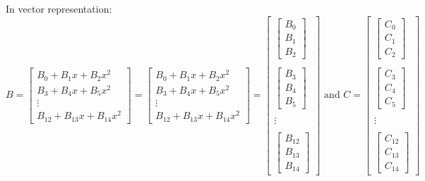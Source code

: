 \documentclass[
11pt,notheorems,hyperref={pdfauthor=whatever}
]{beamer}
\begin{document}
\begin{frame}
    In vector representation:
    \[
    B = \begin{bmatrix}
        B_{0} + B_{1} x + B_{2} x^2 \\
        B_{3} + B_{4} x + B_{5} x^2 \\
        \vdots \\
        B_{12} + B_{13} x + B_{14} x^2 
    \end{bmatrix}
    = \begin{bmatrix}
        B_{0} + B_{1} x + B_{2} x^2 \\
        B_{3} + B_{4} x + B_{5} x^2 \\
        \vdots \\
        B_{12} + B_{13} x + B_{14} x^2 
    \end{bmatrix}
    =
    \begin{bmatrix}
        \begin{bmatrix}
            B_{0} \\ B_{1} \\ B_{2} 
        \end{bmatrix} \\ \\
        \begin{bmatrix}
            B_{3} \\ B_{4} \\ B_{5}
        \end{bmatrix} \\ \\
        \vdots \\\\
        \begin{bmatrix}
            B_{12} \\ B_{13} \\ B_{14}
        \end{bmatrix}
    \end{bmatrix}
    \text{ and }
    C =
    \begin{bmatrix}
        \begin{bmatrix}
            C_{0} \\ C_{1} \\ C_{2} 
        \end{bmatrix} \\ \\
        \begin{bmatrix}
            C_{3} \\ C_{4} \\ C_{5}
        \end{bmatrix} \\ \\
        \vdots \\\\
        \begin{bmatrix}
            C_{12} \\ C_{13} \\ C_{14}
        \end{bmatrix}
    \end{bmatrix}
    \]
\end{frame}
\end{document}
